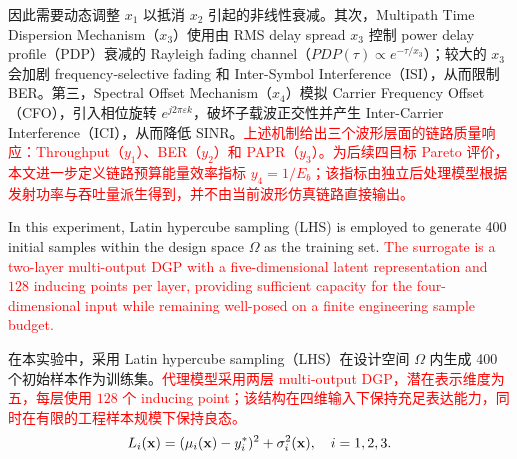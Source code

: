 \documentclass[11pt]{article}
\begin{document}
因此需要动态调整 ${{x}_{1}}$ 以抵消 ${{x}_{2}}$ 引起的非线性衰减。其次，Multipath Time Dispersion Mechanism（${{x}_{3}}$）使用由 RMS delay spread ${{x}_{3}}$ 控制 power delay profile（PDP）衰减的 Rayleigh fading channel（$PDP(\tau )\propto {{e}^{-\tau /{{x}_{3}}}}$）；较大的 ${{x}_{3}}$ 会加剧 frequency-selective fading 和 Inter-Symbol Interference（ISI），从而限制 BER。第三，Spectral Offset Mechanism（${{x}_{4}}$）模拟 Carrier Frequency Offset（CFO），引入相位旋转 ${{e}^{j2\pi \varepsilon k}}$，破坏子载波正交性并产生 Inter-Carrier Interference（ICI），从而降低 SINR。\textcolor{red}{上述机制给出三个波形层面的链路质量响应：Throughput（${{y}_{1}}$）、BER（${{y}_{2}}$）和 PAPR（${{y}_{3}}$）。为后续四目标 Pareto 评价，本文进一步定义链路预算能量效率指标 ${{y}_{4}}=1/{{E}_{b}}$；该指标由独立后处理模型根据发射功率与吞吐量派生得到，并不由当前波形仿真链路直接输出。}%

In this experiment, Latin hypercube sampling (LHS) is employed to generate 400 initial samples within the design space $\Omega$ as the training set. \textcolor{red}{The surrogate is a two-layer multi-output DGP with a five-dimensional latent representation and $128$ inducing points per layer, providing sufficient capacity for the four-dimensional input while remaining well-posed on a finite engineering sample budget.}%

在本实验中，采用 Latin hypercube sampling（LHS）在设计空间 $\Omega$ 内生成 400 个初始样本作为训练集。\textcolor{red}{代理模型采用两层 multi-output DGP，潜在表示维度为五，每层使用 $128$ 个 inducing point；该结构在四维输入下保持充足表达能力，同时在有限的工程样本规模下保持良态。}%
\begin{equation}
	{L_i}({\bf{x}}) = {({\mu _i}({\bf{x}}) - y_i^*)^2} + \sigma _i^2({\bf{x}}),\quad i = 1,2,3.
\end{equation}
\end{document}
